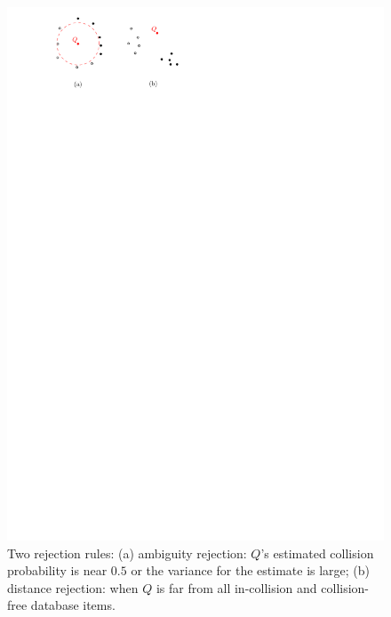 \begin{figure}[htb]
  \centering
  \includegraphics[width=0.7\linewidth]{figs/3/reject.pdf}
  \caption[Two rejection rules used in instance-based learning]{Two rejection rules: (a) ambiguity rejection: $Q$'s estimated collision probability is near $0.5$ or the variance for the estimate is large; (b) distance rejection: when $Q$ is far from all in-collision and collision-free database items.}
  \label{fig:3:reject}
\end{figure}



